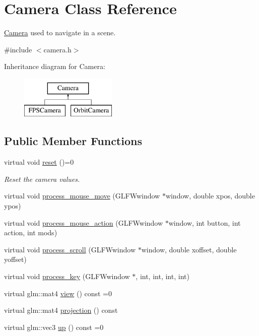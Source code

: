 \hypertarget{classCamera}{}\section{Camera Class Reference}
\label{classCamera}


\hyperlink{classCamera}{Camera} used to navigate in a scene.  




{\ttfamily \#include $<$camera.\+h$>$}

Inheritance diagram for Camera\+:\begin{figure}[H]
\begin{center}
\leavevmode
\includegraphics[height=2.000000cm]{classCamera}
\end{center}
\end{figure}
\subsection*{Public Member Functions}
\begin{DoxyCompactItemize}
\item 
virtual void \hyperlink{classCamera_aa7695a960438e5571e14f50ed69f6623}{reset} ()=0
\begin{DoxyCompactList}\small\item\em Reset the camera values. \end{DoxyCompactList}\item 
virtual void \hyperlink{classCamera_abb67395d3094b766d86ad17cedc054c3}{process\+\_\+mouse\+\_\+move} (G\+L\+F\+Wwindow $\ast$window, double xpos, double ypos)
\item 
virtual void \hyperlink{classCamera_affd5e8a22d61e945ba56d2a807b98e61}{process\+\_\+mouse\+\_\+action} (G\+L\+F\+Wwindow $\ast$window, int button, int action, int mods)
\item 
virtual void \hyperlink{classCamera_ac13cc5fa7a3a5c40e53d95e987c1ff04}{process\+\_\+scroll} (G\+L\+F\+Wwindow $\ast$window, double xoffset, double yoffset)
\item 
virtual void \hyperlink{classCamera_ac7fb896a59f9f456ab2041f9dca9b841}{process\+\_\+key} (G\+L\+F\+Wwindow $\ast$, int, int, int, int)
\item 
virtual glm\+::mat4 \hyperlink{classCamera_a279a5a9fdcdb6161bab2c3ff8fce275b}{view} () const =0
\item 
virtual glm\+::mat4 \hyperlink{classCamera_afc206d8b4484d0d8c5e7333b34c68c6f}{projection} () const
\item 
virtual glm\+::vec3 \hyperlink{classCamera_a3ec282533cfc02be93006259d383b6d2}{up} () const =0
\end{DoxyCompactItemize}
